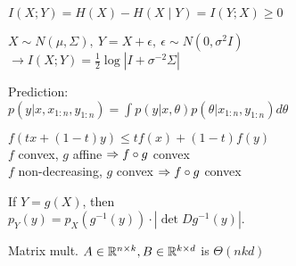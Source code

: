 {{$I(X;Y) = H(X) - H(X \mid Y) = I(Y;X)\geq 0$}}

{$X \sim N(\mu, \Sigma),\ Y = X+ \epsilon, \ \epsilon\sim N(0, \sigma^2 I)$\\
$\rightarrow I(X;Y) = \frac{1}{2} \log |I + \sigma^{-2} \Sigma|$}


Prediction:\\ $p(y |  x, x_{1:n}, y_{1:n}) = \int p(y |  x, \theta) p(\theta |  x_{1:n}, y_{1:n}) d\theta$

$f(t x + (1-t)y) \leq t f(x) + (1-t) f(y)$\\
$f$ convex, $g$ affine $\Rightarrow f\circ g$ convex\\
$f$ non-decreasing, $g$ convex $\Rightarrow f\circ g$ convex

If $Y = g(X)$, then\\\hspace*{3mm}$p_Y(y) = p_X(g^{-1}(y)) \cdot |\det D g^{-1}(y)|$.

Matrix mult. $A\in\mathbb{R}^{n\times k},B\in\mathbb{R}^{k\times d}$ is $\Theta(n k d)$
